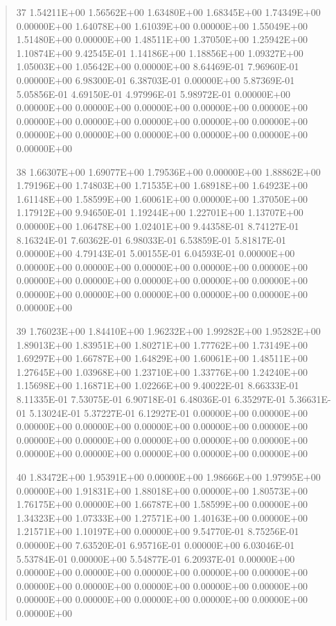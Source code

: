 \documentclass[letterpaper,10pt,english]{sphinxmanual}
\begin{document}
\begin{quote}
\begin{DUlineblock}{0em}
\item[] 37   1.54211E+00  1.56562E+00  1.63480E+00  1.68345E+00  1.74349E+00  0.00000E+00  1.64078E+00  1.61039E+00  0.00000E+00  1.55049E+00  1.51480E+00  0.00000E+00  1.48511E+00  1.37050E+00  1.25942E+00  1.10874E+00  9.42545E-01  1.14186E+00  1.18856E+00  1.09327E+00  1.05003E+00  1.05642E+00  0.00000E+00  8.64469E-01  7.96960E-01  0.00000E+00  6.98300E-01  6.38703E-01  0.00000E+00  5.87369E-01  5.05856E-01  4.69150E-01  4.97996E-01  5.98972E-01  0.00000E+00  0.00000E+00  0.00000E+00  0.00000E+00  0.00000E+00  0.00000E+00  0.00000E+00  0.00000E+00  0.00000E+00  0.00000E+00  0.00000E+00  0.00000E+00  0.00000E+00  0.00000E+00  0.00000E+00  0.00000E+00  0.00000E+00
\item[] 38   1.66307E+00  1.69077E+00  1.79536E+00  0.00000E+00  1.88862E+00  1.79196E+00  1.74803E+00  1.71535E+00  1.68918E+00  1.64923E+00  1.61148E+00  1.58599E+00  1.60061E+00  0.00000E+00  1.37050E+00  1.17912E+00  9.94650E-01  1.19244E+00  1.22701E+00  1.13707E+00  0.00000E+00  1.06478E+00  1.02401E+00  9.44358E-01  8.74127E-01  8.16324E-01  7.60362E-01  6.98033E-01  6.53859E-01  5.81817E-01  0.00000E+00  4.79143E-01  5.00155E-01  6.04593E-01  0.00000E+00  0.00000E+00  0.00000E+00  0.00000E+00  0.00000E+00  0.00000E+00  0.00000E+00  0.00000E+00  0.00000E+00  0.00000E+00  0.00000E+00  0.00000E+00  0.00000E+00  0.00000E+00  0.00000E+00  0.00000E+00  0.00000E+00
\item[] 39   1.76023E+00  1.84410E+00  1.96232E+00  1.99282E+00  1.95282E+00  1.89013E+00  1.83951E+00  1.80271E+00  1.77762E+00  1.73149E+00  1.69297E+00  1.66787E+00  1.64829E+00  1.60061E+00  1.48511E+00  1.27645E+00  1.03968E+00  1.23710E+00  1.33776E+00  1.24240E+00  1.15698E+00  1.16871E+00  1.02266E+00  9.40022E-01  8.66333E-01  8.11335E-01  7.53075E-01  6.90718E-01  6.48036E-01  6.35297E-01  5.36631E-01  5.13024E-01  5.37227E-01  6.12927E-01  0.00000E+00  0.00000E+00  0.00000E+00  0.00000E+00  0.00000E+00  0.00000E+00  0.00000E+00  0.00000E+00  0.00000E+00  0.00000E+00  0.00000E+00  0.00000E+00  0.00000E+00  0.00000E+00  0.00000E+00  0.00000E+00  0.00000E+00
\item[] 40   1.83472E+00  1.95391E+00  0.00000E+00  1.98666E+00  1.97995E+00  0.00000E+00  1.91831E+00  1.88018E+00  0.00000E+00  1.80573E+00  1.76175E+00  0.00000E+00  1.66787E+00  1.58599E+00  0.00000E+00  1.34323E+00  1.07333E+00  1.27571E+00  1.40163E+00  0.00000E+00  1.21571E+00  1.10197E+00  0.00000E+00  9.54770E-01  8.75256E-01  0.00000E+00  7.63520E-01  6.95716E-01  0.00000E+00  6.03046E-01  5.53784E-01  0.00000E+00  5.54877E-01  6.20937E-01  0.00000E+00  0.00000E+00  0.00000E+00  0.00000E+00  0.00000E+00  0.00000E+00  0.00000E+00  0.00000E+00  0.00000E+00  0.00000E+00  0.00000E+00  0.00000E+00  0.00000E+00  0.00000E+00  0.00000E+00  0.00000E+00  0.00000E+00

\end{DUlineblock}
\end{quote}
\end{document}
